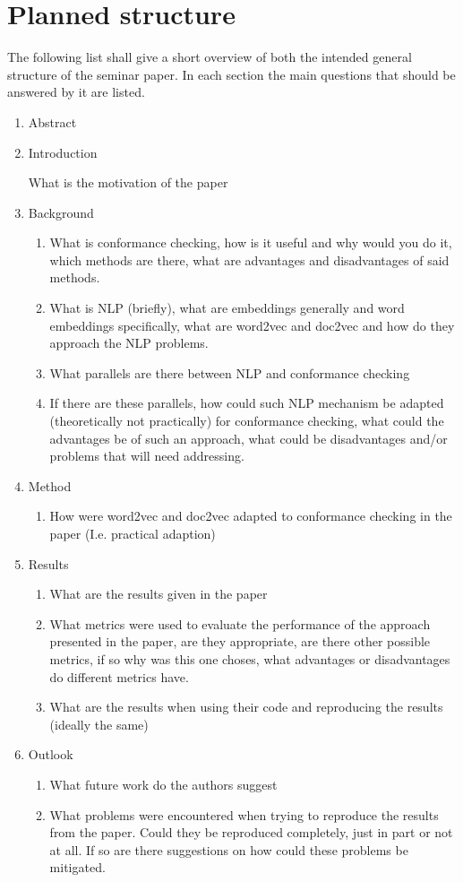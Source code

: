 \documentclass[runningheads]{template/llncs}
\begin{document}
\section{Planned structure}
The following list shall give a short overview of both the intended general structure of the seminar paper. In each section the main questions that should be answered by it are listed.
\begin{enumerate}
	\item Abstract
	\item Introduction
	\begin{enumerate}
		What is the motivation of the paper
	\end{enumerate}
	\item Background
	\begin{enumerate}
		\item What is conformance checking, how is it useful and why would you do it, which methods are there, what are advantages and disadvantages of said methods.
		\item What is NLP (briefly), what are embeddings generally and word embeddings specifically, what are word2vec and doc2vec and how do they approach the NLP problems.
		\item What parallels are there between NLP and conformance checking
		\item If there are these parallels, how could such NLP mechanism be adapted (theoretically not practically) for conformance checking, what could the advantages be of such an approach, what could be disadvantages and/or problems that will need addressing.
	\end{enumerate}
	\item Method
	\begin{enumerate}
		\item How were word2vec and doc2vec adapted to conformance checking in the paper (I.e. practical adaption)
	\end{enumerate}
	\item Results
	\begin{enumerate}
		\item What are the results given in the paper
		\item What metrics were used to evaluate the performance of the approach presented in the paper, are they appropriate, are there other possible metrics, if so why was this one choses, what advantages or disadvantages do different metrics have.
		\item What are the results when using their code and reproducing the results (ideally the same)
	\end{enumerate}
	\item Outlook
	\begin{enumerate}
		\item What future work do the authors suggest
		\item What problems were encountered when trying to reproduce the results from the paper. Could they be reproduced completely, just in part or not at all. If so are there suggestions on how could these problems be mitigated.
	\end{enumerate}
\end{enumerate}
\end{document}
